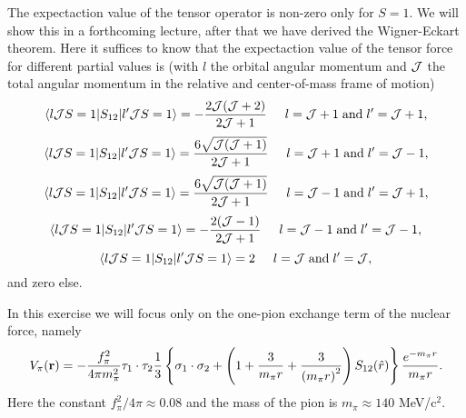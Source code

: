 \documentclass[%
twoside,                 %
final,                   %
10pt]{article}
\begin{document}
The expectaction value of the tensor operator is non-zero only for $S=1$. We will show this in a forthcoming lecture, after that we have derived the Wigner-Eckart theorem. 
Here it suffices to know that the expectaction value of the tensor force for different partial values is  (with $l$ the orbital angular momentum and ${\cal J}$ the total angular momentum in the relative and center-of-mass frame of motion)
\[
\langle l {\cal J}S=1| S_{12} | l' {\cal J}S=1\rangle = -\frac{2{\cal J}({\cal J}+2)}{2{\cal J}+1} \hspace{0.5cm} l= {\cal J}+1 \hspace{0.1cm}\mathrm{and} \hspace{0.1cm} l'={\cal J}+1,
\]
\[
\langle l {\cal J}S=1| S_{12} | l' {\cal J}S=1\rangle = \frac{6\sqrt{{\cal J}({\cal J}+1)}}{2{\cal J}+1} \hspace{0.5cm} l= {\cal J}+1 \hspace{0.1cm}\mathrm{and} \hspace{0.1cm} l'={\cal J}-1,
\]
\[
\langle l {\cal J}S=1| S_{12} | l' {\cal J}S=1\rangle = \frac{6\sqrt{{\cal J}({\cal J}+1)}}{2{\cal J}+1} \hspace{0.5cm} l= {\cal J}-1 \hspace{0.1cm}\mathrm{and} \hspace{0.1cm} l'={\cal J}+1,
\]
\[
\langle l {\cal J}S=1| S_{12} | l' {\cal J}S=1\rangle = -\frac{2({\cal J}-1)}{2{\cal J}+1} \hspace{0.5cm} l= {\cal J}-1 \hspace{0.1cm}\mathrm{and} \hspace{0.1cm} l'={\cal J}-1,
\]
\[
\langle l {\cal J}S=1| S_{12} | l' {\cal J}S=1\rangle = 2 \hspace{0.5cm} l= {\cal J} \hspace{0.1cm}\mathrm{and} \hspace{0.1cm} l'={\cal J},
\]
and zero else.   

In this exercise we will focus only on the one-pion exchange term of the nuclear force, namely
\[
V_{\pi}(\mathbf{r})= -\frac{f_{\pi}^{2}}{4\pi m_{\pi}^{2}}\mathbf{ \tau}_1\cdot\mathbf{\tau}_2
\frac{1}{3}\left\{\mathbf{ \sigma}_1\cdot\mathbf{ \sigma}_2+\left( 1 + {3\over m_\pi r} + {3\over\left(m_\pi r\right)^2}\right) S_{12} (\hat r)\right\} \frac{e^{-m_\pi r}}{m_\pi r}.
\]
Here the constant $f_{\pi}^{2}/4\pi\approx 0.08$ and the mass of the pion is $m_\pi\approx 140$ MeV/c${}^{2}$. 
\end{document}
